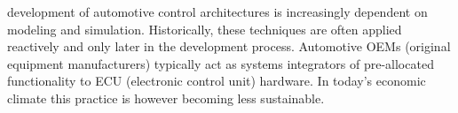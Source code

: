 
% 
% 
% 
% 

 development of automotive control architectures is increasingly dependent on %
modeling and simulation. %
Historically, these techniques are often applied reactively and only later in the development process. Automotive OEMs (original equipment manufacturers) typically act %
as systems  integrators of pre-allocated functionality to  ECU (electronic control unit) hardware. 
In today's economic climate this practice is however becoming less sustainable. 
 
